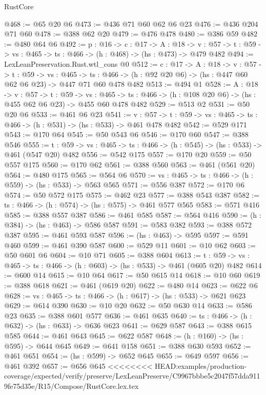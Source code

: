 \begin{lexlean}{RustCore}
\begin{coremodule}
{\begin{coremodule}
@468 := @65 @20 @6
@473 := @436 @71 @60 @62 @6 @23
@476 := @436 @204 @71 @60
@478 := @388 @62 @20
@479 := @476 @478
@480 := @386 @59
@482 := @480 @64 @6
@492 := {p : @16} ->
  {c : @17} ->
  {A : @18} ->
  {v : @57} -> {t : @59} -> {vs : @465} -> {ts : @466} -> (h : @468) -> (hs : @473) -> @479 @482
@494 := LexLeanPreservation.Rust.wtl_cons @0
@512 := {c : @17} ->
  {A : @18} ->
  {v : @57} ->
  {t : @59} ->
  {vs : @465} ->
  {ts : @466} -> (h : @92 @20 @6) -> (hs : @447 @60 @62 @6 @23) -> @447 @71 @60 @478 @482
@513 := @494 @1
@528 := {A : @18} ->
  {v : @57} ->
  {t : @59} ->
  {vs : @465} -> {ts : @466} -> (h : @108 @20 @6) -> (hs : @455 @62 @6 @23) -> @455 @60 @478 @482
@529 := @513 @2
@531 := @50 @20 @6
@533 := @461 @6 @23
@541 := {v : @57} ->
  {t : @59} -> {vs : @465} -> {ts : @466} -> (h : @531) -> (hs : @533) -> @461 @478 @482
@542 := @529 @171
@543 := @170 @64
@545 := @50 @543 @6
@546 := @170 @60
@547 := @388 @546
@555 := {t : @59} -> {vs : @465} -> {ts : @466} -> (h : @545) -> (hs : @533) -> @461 (@547 @20) @482
@556 := @542 @175
@557 := @170 @20
@559 := @50 @557 @175
@560 := @170 @62
@561 := @388 @560
@563 := @461 (@561 @20)
@564 := @480 @175
@565 := @564 @6
@570 := {vs : @465} -> {ts : @466} -> (h : @559) -> (hs : @533) -> @563 @565
@571 := @556 @387
@572 := @170 @6
@574 := @50 @572 @175
@575 := @462 @23
@577 := @388 @543 @387
@582 := {ts : @466} -> (h : @574) -> (hs : @575) -> @461 @577 @565
@583 := @571 @416
@585 := @388 @557 @387
@586 := @461 @585
@587 := @564 @416
@590 := (h : @384) -> (hs : @463) -> @586 @587
@591 := @583 @382
@593 := @388 @572 @387
@595 := @461 @593 @587
@596 := (hs : @463) -> @595
@597 := @591 @460
@599 := @461 @390 @587
@600 := @529 @11
@601 := @10 @62
@603 := @50 @601 @6
@604 := @10 @71
@605 := @388 @604
@613 := {t : @59} -> {vs : @465} -> {ts : @466} -> (h : @603) -> (hs : @533) -> @461 (@605 @20) @482
@614 := @600 @14
@615 := @10 @64
@617 := @50 @615 @14
@618 := @10 @60
@619 := @388 @618
@621 := @461 (@619 @20)
@622 := @480 @14
@623 := @622 @6
@628 := {vs : @465} -> {ts : @466} -> (h : @617) -> (hs : @533) -> @621 @623
@629 := @614 @390
@630 := @10 @20
@632 := @50 @630 @14
@633 := @586 @23
@635 := @388 @601 @577
@636 := @461 @635
@640 := {ts : @466} -> (h : @632) -> (hs : @633) -> @636 @623
@641 := @629 @587
@643 := @388 @615 @585
@644 := @461 @643
@645 := @622 @587
@648 := (h : @160) -> (hs : @595) -> @644 @645
@649 := @641 @158
@651 := @388 @630 @593
@652 := @461 @651
@654 := (hs : @599) -> @652 @645
@655 := @649 @597
@656 := @461 @392
@657 := @656 @645
<<<<<<<< HEAD:examples/production-coverage/expected/verify/preserve/LexLeanPreserve/C9967bbbe5c2047f57dda9119fe75d35e/R15/Compose/RustCore.lex.tex

\end{coremodule}}
\end{coremodule}
\end{lexlean}
